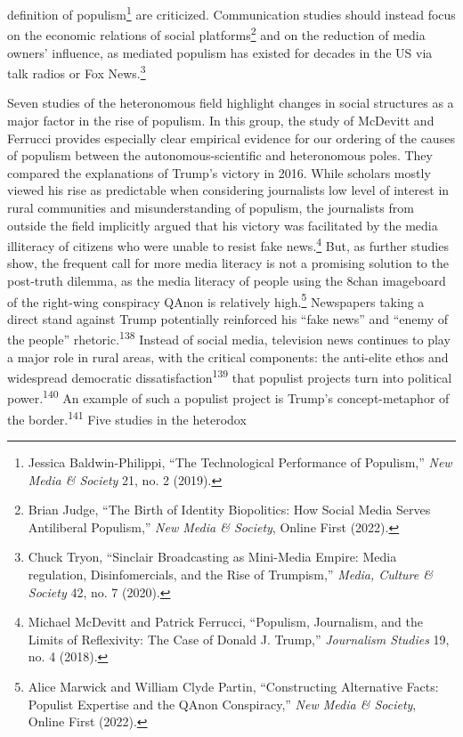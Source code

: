 \documentclass{tufte-handout}
\begin{document}
{{definition of populism\footnote{Jessica Baldwin-Philippi, ``The
  Technological Performance of Populism,'' \emph{New Media \& Society}
  21, no. 2 (2019).} are criticized. Communication studies should
instead focus on the economic relations of social platforms\footnote{Brian
  Judge, ``The Birth of Identity Biopolitics: How Social Media Serves
  Antiliberal Populism,'' \emph{New Media \& Society}, Online First
  (2022).} and on the reduction of media owners' influence, as mediated
populism has existed for decades in the US via talk radios or Fox
News.\footnote{Chuck Tryon, ``Sinclair Broadcasting as Mini-Media
  Empire: Media regulation, Disinfomercials, and the Rise of Trumpism,''
  \emph{Media, Culture \& Society} 42, no. 7 (2020).}

Seven studies of the heteronomous field highlight changes in social
structures as a major factor in the rise of populism. In this group, the
study of McDevitt and Ferrucci provides especially clear empirical
evidence for our ordering of the causes of populism between the
autonomous-scientific and heteronomous poles. They compared the
explanations of Trump's victory in 2016. While scholars mostly viewed
his rise as predictable when considering journalists\textquotesingle{}
low level of interest in rural communities and misunderstanding of
populism, the journalists from outside the field implicitly argued that
his victory was facilitated by the media illiteracy of citizens who were
unable to resist fake news.\footnote{Michael McDevitt and Patrick
  Ferrucci, ``Populism, Journalism, and the Limits of Reflexivity: The
  Case of Donald J. Trump,'' \emph{Journalism Studies} 19, no. 4 (2018).}
But, as further studies show, the frequent call for more media literacy
is not a promising solution to the post-truth dilemma, as the media
literacy of people using the 8chan imageboard of the right-wing
conspiracy QAnon is relatively high.\footnote{Alice Marwick and William
  Clyde Partin, ``Constructing Alternative Facts: Populist Expertise and
  the QAnon Conspiracy,'' \emph{New Media \& Society}, Online First
  (2022).} Newspapers taking a direct stand against Trump potentially
reinforced his ``fake news'' and ``enemy of the people''
rhetoric.\textsuperscript{138} Instead of
social media, television news continues to play a major role in rural
areas, with the critical components: the anti-elite ethos and widespread
democratic dissatisfaction\textsuperscript{139} that populist projects turn into
political power.\textsuperscript{140} An example of such a populist project is Trump's
concept-metaphor of the border.\textsuperscript{141} Five studies in the heterodox}}
\end{document}
